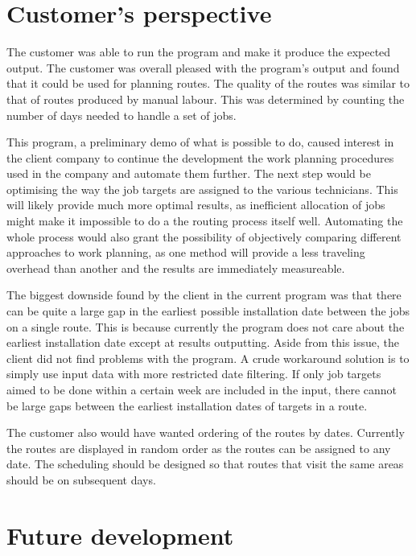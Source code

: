 \section{Customer's perspective}

The customer was able to run the program and make it produce the expected output. The customer was overall pleased with the program's output and found that it could be used for planning routes. The quality of the routes was similar to that of routes produced by manual labour. This was determined by counting the number of days needed to handle a set of jobs.  

This program, a preliminary demo of what is possible to do, caused interest in the client company to continue the development the work planning procedures used in the company and automate them further. The next step would be optimising the way the job targets are assigned to the various technicians. This will likely provide much more optimal results, as inefficient allocation of jobs might make it impossible to do a the routing process itself well. Automating the whole process would also grant the possibility of objectively comparing different approaches to work planning, as one method will provide a less traveling overhead than another and the results are immediately measureable.   

The biggest downside found by the client in the current program was that there can be quite a large gap in the earliest possible installation date between the jobs on a single route. This is because currently the program does not care about the earliest installation date except at results outputting. Aside from this issue, the client did not find problems with the program. A crude workaround solution is to simply use input data with more restricted date filtering. If only job targets aimed to be done within a certain week are included in the input, there cannot be large gaps between the earliest installation dates of targets in a route.

The customer also would have wanted ordering of the routes by dates. Currently the routes are displayed in random order as the routes can be assigned to any date. The scheduling should be designed so that routes that visit the same areas should be on subsequent days.



\section{Future development}

